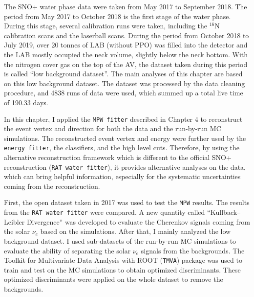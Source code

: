 
The SNO+ water phase data were taken from May 2017 to September 2018. The period from May 2017 to October 2018 is the first stage of the water phase. During this stage, several calibration runs were taken, including the $^{16}$N calibration scans and the laserball scans. During the period from October 2018 to July 2019, over 20 tonnes of LAB (without PPO) was filled into the detector and the LAB mostly occupied the neck volume, slightly below the neck bottom. With the nitrogen cover gas on the top of the AV, the dataset taken during this period is called ``low background dataset''. The main analyses of this chapter are based on this low background dataset. The dataset was processed by the data cleaning procedure, and 4838 runs of data were used, which summed up a total live time of 190.33 days.
 
In this chapter, I applied the \texttt{MPW fitter} described in Chapter 4 to reconstruct the event vertex and direction for both the data and the run-by-run MC simulations. The reconstructed event vertex and energy were further used by the \texttt{energy fitter}, the classifiers, and the high level cuts. Therefore, by using the alternative reconstruction framework which is different to the official SNO+ reconstruction (\texttt{RAT water fitter}), it provides alternative analyses on the data, which can bring helpful information, especially for the systematic uncertainties coming from the reconstruction.

First, the open dataset taken in 2017 was used to test the \texttt{MPW} results. The results from the \texttt{RAT water fitter} were compared. A new quantity called ``Kullback–Leibler Divergence'' was developed to evaluate the Cherenkov signals coming from the solar $\nu_e$ based on the simulations. After that, I mainly analyzed the low background dataset. I used sub-datasets of the run-by-run MC simulations to evaluate the ability of separating the solar $\nu_e$ signals from the backgrounds. The Toolkit for Multivariate Data Analysis with ROOT (\texttt{TMVA}) package\cite{tmvaWebsite,albertsson2007tmva} was used to train and test on the MC simulations to obtain optimized discriminants. These optimized discriminants were applied on the whole dataset to remove the backgrounds.

